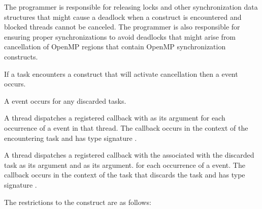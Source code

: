 \begin{note}
The programmer is responsible for releasing locks and
other synchronization data structures that might cause a deadlock when
a  construct is encountered and blocked threads cannot be
canceled. The programmer is also responsible for ensuring proper
synchronizations to avoid deadlocks that might arise from cancellation
of OpenMP regions that contain OpenMP synchronization constructs.
\end{note}

\events

If a task encounters a  construct that will
  activate cancellation then a  event occurs.

A  event occurs for any discarded tasks.

\tools

A thread dispatches a registered  callback with
 as its  argument for each occurrence 
of a  event in that thread. The callback occurs in the context of 
the encountering task and has type signature .

A thread dispatches a registered  callback with
the  associated with the discarded task as its  
argument and  as its  argument.
for each occurrence of a  event. The callback occurs in 
the context of the task that discards the task and has type signature 
.

\restrictions
The restrictions to the  construct are as follows:


